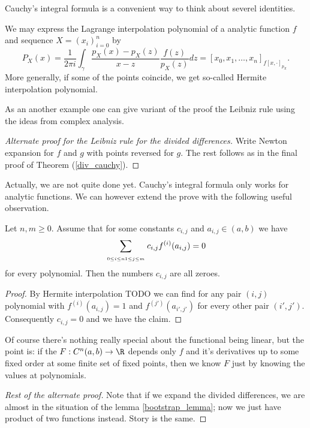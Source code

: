 Cauchy's integral formula is a convenient way to think about severel identities.

\begin{esim}
We may express the Lagrange interpolation polynomial of a analytic function $f$ and sequence $X = (x_{i})_{i = 0}^{n}$ by
\[
	P_{X}(x) = \frac{1}{2 \pi i} \int_{\gamma} \frac{p_{X}(x) - p_{X}(z)}{x - z}\frac{f(z)}{p_{X}(z)} dz = [x_{0}, x_{1}, \ldots, x_{n}]_{f [x, \cdot]_{p_{X}}}.
\]
More generally, if some of the points coincide, we get so-called Hermite interpolation polynomial.
\end{esim}
As an another example one can give variant of the proof the Leibniz rule using the ideas from complex analysis.
\begin{proof}[Alternate proof for the Leibniz rule for the divided differences]
	Write Newton expansion for $f$ and $g$ with points reversed for $g$. The rest follows as in the final proof of Theorem (\ref{div_cauchy}).
\end{proof}

Actually, we are not quite done yet. Cauchy's integral formula only works for analytic functions. We can however extend the prove with the following useful observation.
\begin{lem}\label{bootstrap_lemma}
	Let $n, m \geq 0$. Assume that for some constants $c_{i, j}$ and $a_{i, j} \in (a, b)$ we have
	\begin{align*}
	\sum_{\atop{0 \leq i \leq n}{1 \leq j \leq m}} c_{i, j} f^{(i)}(a_{i, j}) = 0
	\end{align*}
	for every polynomial. Then the numbers $c_{i, j}$ are all zeroes.
\end{lem}
\begin{proof}
	By Hermite interpolation TODO we can find for any pair $(i, j)$ polynomial with $f^{(i)}(a_{i, j}) = 1$ and $f^{(j')}(a_{i', j'})$ for every other pair $(i', j')$. Consequently $c_{i, j} = 0$ and we have the claim.
\end{proof}

Of course there's nothing really special about the functional being linear, but the point is: if the $F : C^{n}(a, b) \to \R$ depends only $f$ and it's derivatives up to some fixed order at some finite set of fixed points, then we know $F$ just by knowing the values at polynomials.

\begin{proof}[Rest of the alternate proof]
	Note that if we expand the divided differences, we are almost in the situation of the lemma \ref{bootstrap_lemma}; now we just have product of two functions instead. Story is the same.
\end{proof}

